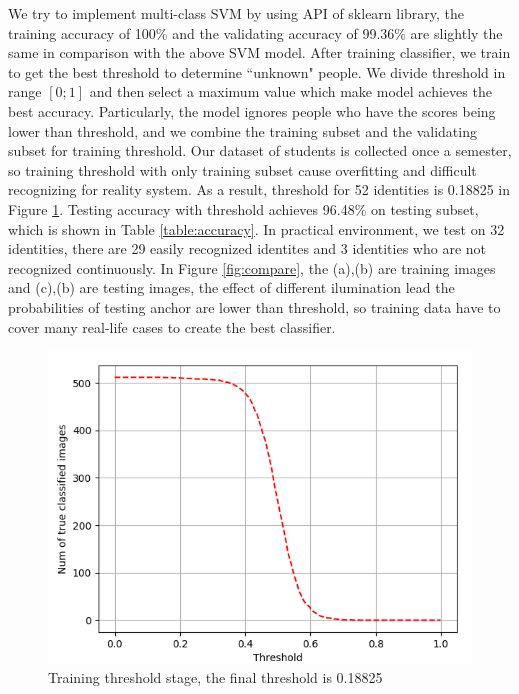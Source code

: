 \documentclass[journal, twocolumn]{IEEEtran}
\begin{document}
We try to implement multi-class SVM by using API of sklearn library, the training accuracy of 100\% and the validating accuracy of 99.36\% are slightly the same in comparison with the above SVM model. After training classifier, we train to get the best threshold to determine ``unknown" people. We divide threshold in range $[0;1]$ and then select a maximum value which make model achieves the best accuracy. Particularly, the model ignores people who have the scores being lower than threshold, and we combine the training subset and the validating subset for training threshold. Our dataset of students is collected once a semester, so training threshold with only training subset cause overfitting and difficult recognizing for reality system. As a result, threshold for 52 identities is 0.18825 in Figure \ref{fig:thres}. Testing accuracy with threshold achieves 96.48\% on testing subset, which is shown in Table \ref{table:accuracy}. In practical environment, we test on 32 identities, there are 29 easily recognized identites and 3 identities who are not recognized continuously. In Figure \ref{fig:compare}, the (a),(b) are training images and (c),(b) are testing images, the effect of different ilumination lead the probabilities of testing anchor are lower than threshold, so training data have to cover many real-life cases to create the best classifier.

 
\begin{figure}
    \centering
    \includegraphics[width=1\linewidth]{img/thres.png}
	\caption{Training threshold stage, the final threshold is 0.18825}\label{fig:thres}
\end{figure}
\end{document}
